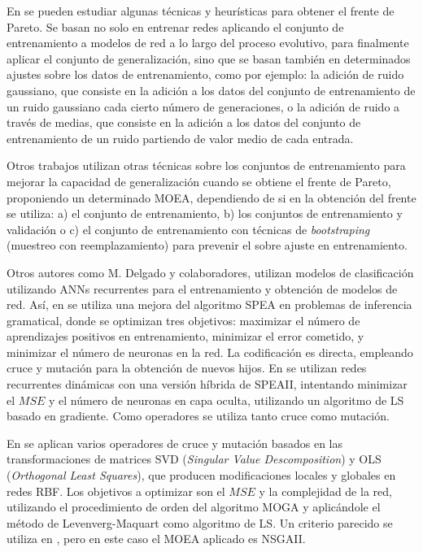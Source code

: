 En \cite{Jin2006b} se pueden estudiar algunas técnicas y heurísticas para obtener el
frente de Pareto. Se basan no solo en entrenar redes aplicando el conjunto de
entrenamiento a modelos de red a lo largo del proceso evolutivo, para finalmente
aplicar el conjunto de generalización, sino que se basan también en determinados ajustes
sobre los datos de entrenamiento, como por ejemplo: la adición de ruido gaussiano, que
consiste en la adición a los datos del conjunto de entrenamiento de un ruido
gaussiano cada cierto número de generaciones, o la adición de ruido a través de
medias, que consiste en la adición a los datos del conjunto de entrenamiento de un
ruido partiendo de valor medio de cada entrada.

Otros trabajos \cite{Fieldsend2002,Fieldsend2005} utilizan otras técnicas sobre los
conjuntos de entrenamiento para mejorar la capacidad de generalización cuando se obtiene
el frente de
Pareto, proponiendo un determinado MOEA, dependiendo de si en la obtención del frente se
utiliza: a) el conjunto de entrenamiento, b) los conjuntos de entrenamiento y validación
o c) el conjunto de entrenamiento con técnicas de \textit{bootstraping} (muestreo con
reemplazamiento) \cite{Bootstrapping2006} para prevenir el
sobre ajuste en entrenamiento.

Otros autores como M. Delgado y colaboradores, utilizan modelos de clasificación utilizando ANNs
recurrentes para el entrenamiento y obtención de modelos de red. Así, en
\cite{Delgado2005} se utiliza una
mejora del algoritmo SPEA en problemas de inferencia gramatical, donde se optimizan tres
objetivos: maximizar el número de aprendizajes positivos en entrenamiento, minimizar el
error cometido, y minimizar el número de neuronas en la red. La codificación es directa,
empleando cruce y mutación para la obtención de nuevos hijos. En \cite{Delgado2007} se
utilizan redes recurrentes dinámicas con una versión híbrida de SPEAII, intentando
minimizar el $MSE$ y el número de neuronas en capa oculta, utilizando un algoritmo de LS
basado en gradiente. Como operadores se utiliza tanto cruce como mutación.

En \cite{Gonzalez2003} se aplican varios operadores de cruce y mutación basados en las
transformaciones de matrices SVD (\textit{Singular Value Descomposition}) y OLS
(\textit{Orthogonal Least Squares}), que producen modificaciones locales y globales en
redes RBF. Los objetivos a optimizar
son el $MSE$ y la complejidad de la red, utilizando el procedimiento de orden
del algoritmo MOGA y aplicándole el método de Levenverg-Maquart \cite{Marquardt1963} como
algoritmo de LS. Un criterio parecido se utiliza en \cite{Hatanaka2006}, pero en este caso
el MOEA aplicado es NSGAII.

